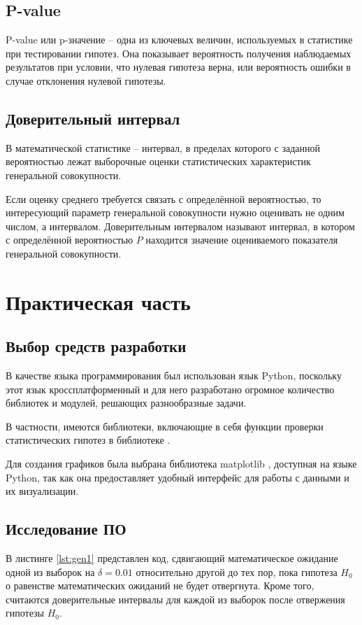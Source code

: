 \documentclass[12pt]{report}
\begin{document}
\section{P-value}

P-value или p-значение -- одна из ключевых величин, используемых в статистике при тестировании гипотез. Она показывает вероятность получения наблюдаемых результатов при условии, что нулевая гипотеза верна, или вероятность ошибки в случае отклонения нулевой гипотезы.

\section{Доверительный интервал}
В математической статистике -- интервал, в пределах которого с заданной вероятностью лежат выборочные оценки статистических характеристик генеральной совокупности.

Если оценку среднего требуется связать с определённой
вероятностью, то интересующий параметр генеральной
совокупности нужно оценивать не одним числом, а интервалом.
Доверительным интервалом называют интервал, в котором с
определённой вероятностью $P$ находится значение оцениваемого показателя генеральной совокупности.

\chapter{Практическая часть}

\section{Выбор средств разработки}
В качестве языка программирования был использован язык Python, поскольку этот язык кроссплатформенный и для него разработано огромное количество библиотек и модулей, решающих разнообразные задачи. 

В частности, имеются библиотеки, включающие в себя функции проверки статистических гипотез в библиотеке \cite{bib:scipy}.

Для создания графиков была выбрана библиотека matplotlib \cite{bib:matplotlib}, доступная на языке Python, так как она предоставляет удобный интерфейс для работы с данными и их визуализации.

\section{Исследование ПО}

В листинге \ref{lst:gen1} представлен код, сдвигающий математическое ожидание одной из выборок на $\delta = 0.01$ относительно другой до тех пор, пока гипотеза $H_0$ о равенстве математических ожиданий не будет отвергнута. Кроме того, считаются доверительные интервалы для каждой из выборок после отвержения гипотезы $H_0$.
\end{document}
